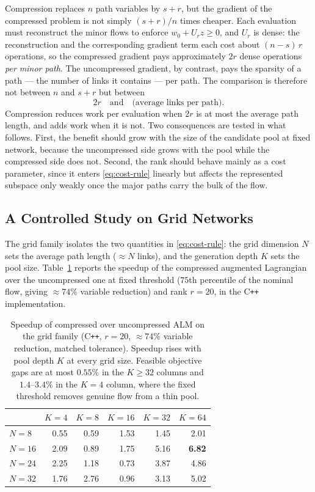 \documentclass[11pt]{article}
\begin{document}
Compression replaces $n$ path variables by $s+r$, but the gradient of the compressed problem
is not simply $(s+r)/n$ times cheaper. Each evaluation must reconstruct the minor flows to
enforce $w_0+U_rz\ge 0$, and $U_r$ is dense: the reconstruction and the corresponding
gradient term each cost about $(n-s)\,r$ operations, so the compressed gradient pays
approximately $2r$ dense operations \emph{per minor path}. The uncompressed gradient, by
contrast, pays the sparsity of a path --- the number of links it contains --- per path. The
comparison is therefore not between $n$ and $s+r$ but between
\begin{equation}
\label{eq:cost-rule}
2r \quad\text{and}\quad \text{(average links per path)} .
\end{equation}
Compression reduces work per evaluation when $2r$ is at most the average path length, and
adds work when it is not. Two consequences are tested in what follows. First, the benefit
should grow with the size of the candidate pool at fixed network, because the uncompressed
side grows with the pool while the compressed side does not. Second, the rank should behave
mainly as a cost parameter, since it enters \eqref{eq:cost-rule} linearly but affects the
represented subspace only weakly once the major paths carry the bulk of the flow.


\subsection{A Controlled Study on Grid Networks}
\label{sec:grid-study}


The grid family isolates the two quantities in \eqref{eq:cost-rule}: the grid dimension $N$
sets the average path length ($\approx N$ links), and the generation depth $K$ sets the pool
size. Table~\ref{tab:grid-matrix} reports the speedup of the compressed augmented Lagrangian
over the uncompressed one at fixed threshold ($75$th percentile of the nominal flow, giving
$\approx 74\%$ variable reduction) and rank $r=20$, in the C\texttt{++} implementation.

\begin{table}[h]
\centering
\caption{Speedup of compressed over uncompressed ALM on the grid family
(C\texttt{++}, $r=20$, $\approx74\%$ variable reduction, matched tolerance). Speedup rises
with pool depth $K$ at every grid size. Feasible objective gaps are at most $0.55\%$ in the
$K\ge32$ columns and $1.4$--$3.4\%$ in the $K=4$ column, where the fixed threshold removes
genuine flow from a thin pool.}
\label{tab:grid-matrix}
{\small
\begin{tabular}{lrrrrr}
\toprule
& $K=4$ & $K=8$ & $K=16$ & $K=32$ & $K=64$\\
\midrule
$N=8$  & 0.55 & 0.59 & 1.53 & 1.45 & 2.01\\
$N=16$ & 2.09 & 0.89 & 1.75 & 5.16 & \textbf{6.82}\\
$N=24$ & 2.25 & 1.18 & 0.73 & 3.87 & 4.86\\
$N=32$ & 1.76 & 2.76 & 0.96 & 3.13 & 5.02\\
\bottomrule
\end{tabular}}
\end{table}
\end{document}
